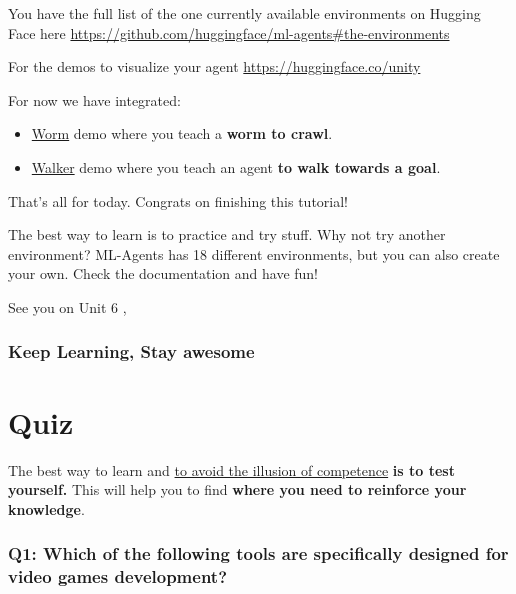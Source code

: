 \documentclass[11pt,a4paper]{article}
\begin{document}

You have the full list of the one currently available environments on Hugging Face here \url{https://github.com/huggingface/ml-agents#the-environments}

For the demos to visualize your agent \url{https://huggingface.co/unity}

For now we have integrated:

\begin{itemize}
\tightlist
\item
  \href{https://huggingface.co/spaces/unity/ML-Agents-Worm}{Worm} demo where you teach a \textbf{worm to crawl}.
\item
  \href{https://huggingface.co/spaces/unity/ML-Agents-Walker}{Walker} demo where you teach an agent \textbf{to walk towards a goal}.
\end{itemize}

That's all for today. Congrats on finishing this tutorial!

The best way to learn is to practice and try stuff. Why not try another environment? ML-Agents has 18 different environments, but you can also create your own. Check the documentation and have fun!

See you on Unit 6 ,

\subsubsection{Keep Learning, Stay awesome}\label{keep-learning-stay-awesome}

\section{Quiz}\label{quiz}

The best way to learn and \href{https://www.coursera.org/lecture/learning-how-to-learn/illusions-of-competence-BuFzf}{to avoid the illusion of competence} \textbf{is to test yourself.} This will help you to find \textbf{where you need to reinforce your knowledge}.

\subsubsection{Q1: Which of the following tools are specifically designed for video games development?}\label{q1-which-of-the-following-tools-are-specifically-designed-for-video-games-development}
\end{document}
